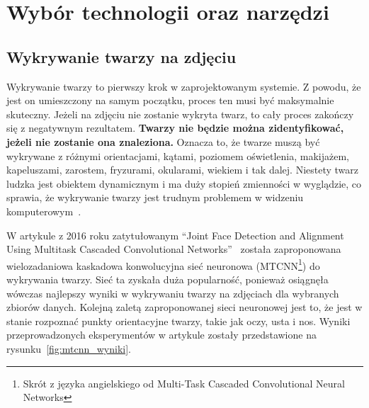 \chapter{Wybór technologii oraz narzędzi}


\section{Wykrywanie twarzy na zdjęciu}

Wykrywanie twarzy to pierwszy krok w zaprojektowanym systemie.
Z powodu, że jest on umieszczony na samym początku, proces ten musi być maksymalnie skuteczny.
Jeżeli na zdjęciu nie zostanie wykryta twarz, to cały proces zakończy się z negatywnym rezultatem.
\textbf{Twarzy nie będzie można zidentyfikować, jeżeli nie zostanie ona znaleziona.}
Oznacza to, że twarze muszą być wykrywane z różnymi orientacjami, kątami,
poziomem oświetlenia, makijażem, kapeluszami, zarostem, fryzurami, okularami, wiekiem i tak dalej.
Niestety twarz ludzka jest obiektem dynamicznym i ma duży stopień zmienności w wyglądzie,
co sprawia, że wykrywanie twarzy jest trudnym problemem w widzeniu komputerowym~\cite{HJELMAS2001236}.

W artykule z 2016 roku zatytułowanym
``Joint Face Detection and Alignment Using Multitask Cascaded Convolutional Networks''~\cite{zhang2016joint}
została zaproponowana wielozadaniowa kaskadowa konwolucyjna sieć neuronowa
(MTCNN\footnote{Skrót z języka angielskiego od Multi-Task Cascaded Convolutional Neural Networks })
do wykrywania twarzy.
Sieć ta zyskała duża popularność, ponieważ osiągnęła wówczas najlepszy wyniki
w wykrywaniu twarzy na zdjęciach dla wybranych zbiorów danych.
Kolejną zaletą zaproponowanej sieci neuronowej jest to, że jest w stanie rozpoznać punkty orientacyjne twarzy, takie jak oczy, usta i nos.
Wyniki przeprowadzonych eksperymentów w artykule zostały przedstawione na rysunku~\ref{fig:mtcnn_wyniki}.

